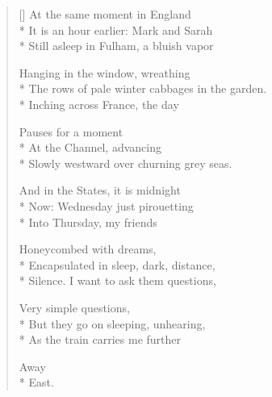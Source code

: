 \label{ch:arabesque}
\settowidth{\versewidth}{The rows of pale winter cabbages in the garden.}
\begin{verse}[\versewidth]
At the same moment in England\\*
It is an hour earlier: Mark and Sarah\\*
Still asleep in Fulham, a bluish vapor

Hanging in the window, wreathing\\*
The rows of pale winter cabbages in the garden.\\*
Inching across France, the day

Pauses for a moment\\*
At the Channel, advancing\\*
Slowly westward over churning grey seas.

And in the States, it is midnight\\*
Now: Wednesday just pirouetting\\*
Into Thursday, my friends

Honeycombed with dreams,\\*
Encapsulated in sleep, dark, distance,\\*
Silence.   I want to ask them questions,

Very simple questions,\\*
But they go on sleeping, unhearing,\\*
As the train carries me further

\hspace*{3\vgap} Away\\*
\hspace*{4\vgap} East.
\end{verse}
